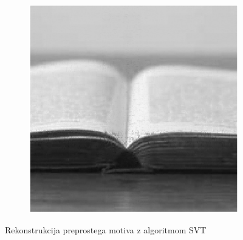 \begin{figure}
\begin{subfigure}{0.325\linewidth}
    \end{subfigure}
    \hfill
    \begin{subfigure}{0.325\linewidth}
        \includegraphics[width=\linewidth]{Poglavja/Slike/preprosta grayscale 300/rez60SVT.png}
    \end{subfigure}
    \caption{Rekonstrukcija preprostega motiva z algoritmom SVT}
\end{figure}
    
